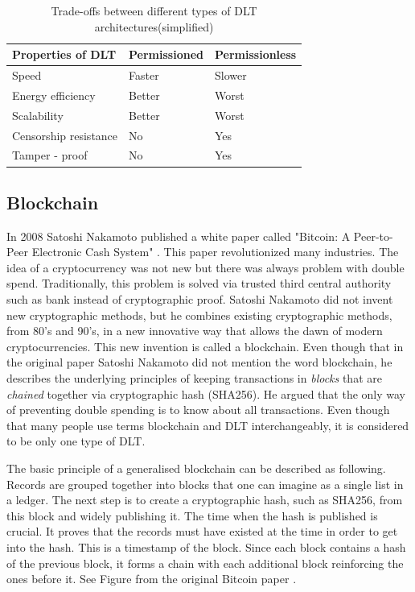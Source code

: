 \begin{table}[ht]
\centering
\caption{Trade-offs between different types of DLT architectures(simplified)}
\label{properties-of-DLT}
\begin{tabular}{|l|l|l|}
\cline{1-3}
\textbf{Properties of DLT} & \textbf{Permissioned} & \textbf{Permissionless} \\ \hline
Speed & Faster & Slower \\ \hline
Energy efficiency & Better & Worst \\ \hline
Scalability & Better & Worst \\ \hline
Censorship resistance & No & Yes \\ \hline
Tamper - proof & No & Yes \\ \hline
\end{tabular}
\end{table}

\subsection{Blockchain}
In 2008 Satoshi Nakamoto published a white paper called "Bitcoin: A Peer-to-Peer Electronic Cash System" \cite{nakamoto_bitcoin:_2008}. This paper revolutionized many industries. The idea of a cryptocurrency was not new but there was always problem with double spend. Traditionally, this problem is solved via trusted third central authority such as bank instead of cryptographic proof. Satoshi Nakamoto did not invent new cryptographic methods, but he combines existing cryptographic methods, from 80's and 90's, in a new innovative way that allows the dawn of modern cryptocurrencies. This new invention is called  a blockchain. Even though that in the original paper Satoshi Nakamoto did not mention the word blockchain, he describes the underlying principles of keeping transactions in \textit{blocks} that are \textit{chained} together via cryptographic hash (SHA256). He argued that the only way of preventing double spending is to know about all transactions. Even though that many people use terms blockchain and DLT interchangeably, it is considered to be only one type of DLT.

The basic principle of a generalised blockchain can be described as following. Records are grouped together into blocks that one can imagine as a single list in a ledger. The next step is to create a cryptographic hash, such as SHA256, from this block and widely publishing it. The time when the hash is published is crucial. It proves that the records must have existed at the time in order to get into the hash. This is a timestamp of the block. Since each block contains a hash of the previous block, it forms a chain with each additional block reinforcing the ones before it. See Figure from the original Bitcoin paper \cite{nakamoto_bitcoin:_2008}.

